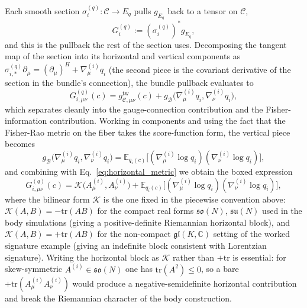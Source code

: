 \documentclass[11pt]{article}
\begin{document}
Each smooth section $\sigma_i^{(q)}: \mathcal{C} \to E_q$ pulls $g_{E_q}$ back to a tensor on $\mathcal{C}$,
\begin{equation}
G_i^{(q)} := (\sigma_i^{(q)})^* g_{E_q},
\end{equation}
and this is the pullback the rest of the section uses. Decomposing the tangent map of the section into its horizontal and vertical components as $\sigma_{i,*}^{(q)}\partial_\mu = (\partial_\mu)^H + \nabla^{(i)}_\mu q_i$ (the second piece is the covariant derivative of the section in the bundle's connection), the bundle pullback evaluates to
\begin{equation}
G^{(q)}_{i,\mu\nu}(c) = g_{\mathcal{C},\mu\nu}^{\mathrm{tw}}(c) + g_{\mathcal{B}}\big(\nabla^{(i)}_\mu q_i, \nabla^{(i)}_\nu q_i\big),
\end{equation}
which separates cleanly into the gauge-connection contribution and the Fisher-information contribution. Working in components and using the fact that the Fisher-Rao metric on the fiber takes the score-function form, the vertical piece becomes
\begin{equation}
g_{\mathcal{B}}\big(\nabla^{(i)}_\mu q_i, \nabla^{(i)}_\nu q_i\big) = \mathbb{E}_{q_i(c)}\big[(\nabla^{(i)}_\mu \log q_i)(\nabla^{(i)}_\nu \log q_i)\big],
\end{equation}
and combining with Eq.~\eqref{eq:horizontal_metric} we obtain the boxed expression
\begin{equation}
\boxed{G^{(q)}_{i,\mu\nu}(c) = \mathcal{K}\big(A^{(i)}_\mu, A^{(i)}_\nu\big) + \mathbb{E}_{q_i(c)}\big[(\nabla^{(i)}_\mu \log q_i)(\nabla^{(i)}_\nu \log q_i)\big],}
\label{eq:induced_metric_full}
\end{equation}
where the bilinear form $\mathcal{K}$ is the one fixed in the piecewise convention above: $\mathcal{K}(A,B) = -\mathrm{tr}(AB)$ for the compact real forms $\mathfrak{so}(N)$, $\mathfrak{su}(N)$ used in the body simulations (giving a positive-definite Riemannian horizontal block), and $\mathcal{K}(A,B) = +\mathrm{tr}(AB)$ for the non-compact $\mathfrak{gl}(K, \mathbb{C})$ setting of the worked signature example (giving an indefinite block consistent with Lorentzian signature). Writing the horizontal block as $\mathcal{K}$ rather than $+\mathrm{tr}$ is essential: for skew-symmetric $A^{(i)} \in \mathfrak{so}(N)$ one has $\mathrm{tr}(A^2) \le 0$, so a bare $+\mathrm{tr}(A^{(i)}_\mu A^{(i)}_\nu)$ would produce a negative-semidefinite horizontal contribution and break the Riemannian character of the body construction.
\end{document}
